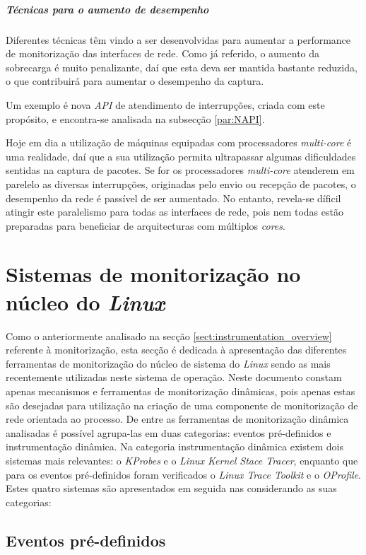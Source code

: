 \subparagraph*{Técnicas para o aumento de desempenho}
Diferentes técnicas têm vindo a ser desenvolvidas para aumentar a performance de monitorização das interfaces de rede.
Como já referido, o aumento da sobrecarga é muito penalizante, daí que esta deva ser mantida bastante reduzida, o que contribuirá para aumentar o desempenho da captura.

Um exemplo é nova \textit{API} de atendimento de interrupções, criada com este propósito, e encontra-se analisada na subsecção \ref{par:NAPI}.

Hoje em dia a utilização de máquinas equipadas com processadores \textit{multi-core} é uma realidade, daí que a sua utilização permita ultrapassar algumas dificuldades sentidas na captura de pacotes.
Se for os processadores \textit{multi-core} atenderem em parelelo as diversas interrupções, originadas pelo envio ou recepção de pacotes, o desempenho da rede é passível de ser aumentado.
No entanto, revela-se díficil atingir este paralelismo para todas as interfaces de rede, pois nem todas estão preparadas para beneficiar de arquitecturas com múltiplos \textit{cores}.

\section{Sistemas de monitorização no núcleo do \textit{Linux}}\label{sect:instrumentacao_casos_linux}

Como o anteriormente analisado na secção \ref{sect:instrumentation_overview} referente à monitorização, esta secção é dedicada à apresentação das diferentes ferramentas de monitorização do núcleo de sistema do \textit{Linux} sendo as mais recentemente utilizadas neste sistema de operação.
Neste documento constam apenas mecanismos e ferramentas de monitorização dinâmicas, pois apenas estas são desejadas para utilização na criação de uma componente de monitorização de rede orientada ao processo.
De entre as ferramentas de monitorização dinâmica analisadas é possível agrupa-las em duas categorias: eventos pré-definidos e instrumentação dinâmica.
Na categoria instrumentação dinâmica existem dois sistemas mais relevantes: o \textit{KProbes} e o \textit{Linux Kernel Stace Tracer}, enquanto que para os eventos pré-definidos foram verificados o \textit{Linux Trace Toolkit} e o \textit{OProfile}.
Estes quatro sistemas são apresentados em seguida nas considerando as suas categorias:

\subsection{Eventos pré-definidos}

